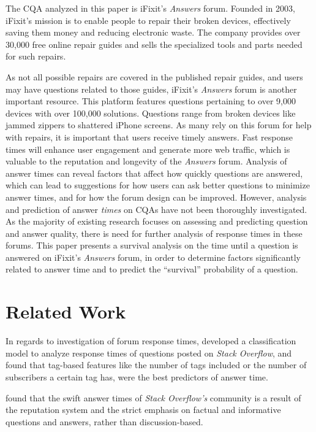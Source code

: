 \documentclass{article}
\begin{document}
The CQA analyzed in this paper is iFixit's \textit{Answers} forum. Founded in 2003, iFixit's mission is to enable people to repair their broken devices, effectively saving them money and reducing electronic waste. The company provides over 30,000 free online repair guides and sells the specialized tools and parts needed for such repairs.
    
As not all possible repairs are covered in the published repair guides, and users may have questions related to those guides, iFixit's \textit{Answers} forum is another important resource. This platform features questions pertaining to over 9,000 devices with over 100,000 solutions. Questions range from broken devices like jammed zippers to shattered iPhone screens. As many rely on this forum for help with repairs, it is important that users receive timely answers. Fast response times will enhance user engagement and generate more web traffic, which is valuable to the reputation and longevity of the \textit{Answers} forum. Analysis of answer times can reveal factors that affect how quickly questions are answered, which can lead to suggestions for how users can ask better questions to minimize answer times, and for how the forum design can be improved. 
However, analysis and prediction of answer \textit{times} on CQAs have not been thoroughly investigated. As the majority of existing research focuses on assessing and predicting question and answer quality, there is need for further analysis of response times in these forums. This paper presents a survival analysis on the time until a question is answered on iFixit's \textit{Answers} forum, in order to determine factors significantly related to answer time and to predict the ``survival'' probability of a question.


\section*{Related Work}
  
In regards to investigation of forum response times, \citep{Bhat2014} developed a classification model to analyze response times of questions posted on \textit{Stack Overflow}, and found that tag-based features like the number of tags included or the number of subscribers a certain tag has, were the best predictors of answer time. 

\citep{Mamykina2011} found that the swift answer times of \textit{Stack Overflow's} community is a result of the reputation system and the strict emphasis on factual and informative questions and answers, rather than discussion-based. 
\end{document}
